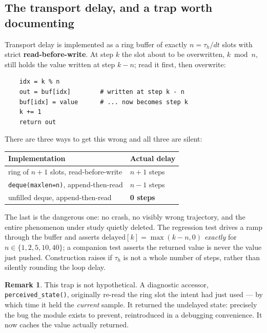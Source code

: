 \documentclass[11pt,a4paper]{article}
\theoremstyle{plain}
\theoremstyle{definition}
\newtheorem{remark}{Remark}
\begin{document}
\subsection{The transport delay, and a trap worth documenting}

Transport delay is implemented as a ring buffer of exactly $n =
\tau_h/dt$ slots with strict \textbf{read-before-write}. At step $k$ the
slot about to be overwritten, $k \bmod n$, still holds the value written
at step $k - n$; read it first, then overwrite:

\begin{verbatim}
    idx = k % n
    out = buf[idx]        # written at step k - n
    buf[idx] = value      # ... now becomes step k
    k += 1
    return out
\end{verbatim}

There are three ways to get this wrong and all three are silent:

\begin{center}
\small
\begin{tabular}{@{}ll@{}}
\toprule
Implementation & Actual delay \\
\midrule
ring of $n+1$ slots, read-before-write & $n+1$ steps \\
\texttt{deque(maxlen=n)}, append-then-read & $n-1$ steps \\
unfilled deque, append-then-read & \textbf{0 steps} \\
\bottomrule
\end{tabular}
\end{center}

The last is the dangerous one: no crash, no visibly wrong trajectory,
and the entire phenomenon under study quietly deleted. The regression
test drives a ramp through the buffer and asserts
$\text{delayed}[k] = \max(k-n, 0)$ \emph{exactly} for
$n \in \{1,2,5,10,40\}$; a companion test asserts the returned value is
never the value just pushed. Construction raises if $\tau_h$ is not a
whole number of steps, rather than silently rounding the loop delay.

\begin{remark}
This trap is not hypothetical. A diagnostic accessor,
\texttt{perceived\_state()}, originally re-read the ring slot the intent
had just used --- by which time it held the \emph{current} sample. It
returned the undelayed state: precisely the bug the module exists to
prevent, reintroduced in a debugging convenience. It now caches the
value actually returned.
\end{remark}
\end{document}
